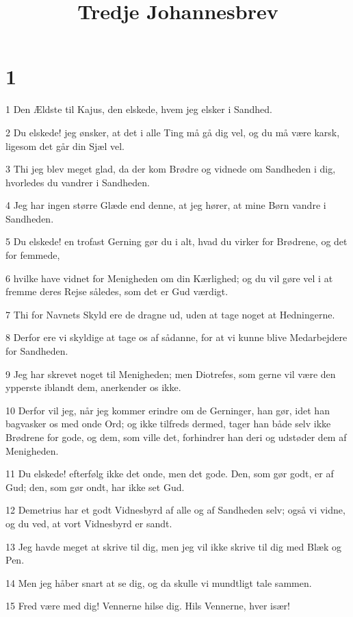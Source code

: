 

\title{Tredje Johannesbrev}


\chapter{1}

\par 1 Den Ældste til Kajus, den elskede, hvem jeg elsker i Sandhed.
\par 2 Du elskede! jeg ønsker, at det i alle Ting må gå dig vel, og du må være karsk, ligesom det går din Sjæl vel.
\par 3 Thi jeg blev meget glad, da der kom Brødre og vidnede om Sandheden i dig, hvorledes du vandrer i Sandheden.
\par 4 Jeg har ingen større Glæde end denne, at jeg hører, at mine Børn vandre i Sandheden.
\par 5 Du elskede! en trofast Gerning gør du i alt, hvad du virker for Brødrene, og det for femmede,
\par 6 hvilke have vidnet for Menigheden om din Kærlighed; og du vil gøre vel i at fremme deres Rejse således, som det er Gud værdigt.
\par 7 Thi for Navnets Skyld ere de dragne ud, uden at tage noget at Hedningerne.
\par 8 Derfor ere vi skyldige at tage os af sådanne, for at vi kunne blive Medarbejdere for Sandheden.
\par 9 Jeg har skrevet noget til Menigheden; men Diotrefes, som gerne vil være den ypperste iblandt dem, anerkender os ikke.
\par 10 Derfor vil jeg, når jeg kommer erindre om de Gerninger, han gør, idet han bagvasker os med onde Ord; og ikke tilfreds dermed, tager han både selv ikke Brødrene for gode, og dem, som ville det, forhindrer han deri og udstøder dem af Menigheden.
\par 11 Du elskede! efterfølg ikke det onde, men det gode. Den, som gør godt, er af Gud; den, som gør ondt, har ikke set Gud.
\par 12 Demetrius har et godt Vidnesbyrd af alle og af Sandheden selv; også vi vidne, og du ved, at vort Vidnesbyrd er sandt.
\par 13 Jeg havde meget at skrive til dig, men jeg vil ikke skrive til dig med Blæk og Pen.
\par 14 Men jeg håber snart at se dig, og da skulle vi mundtligt tale sammen.
\par 15 Fred være med dig! Vennerne hilse dig. Hils Vennerne, hver især!


